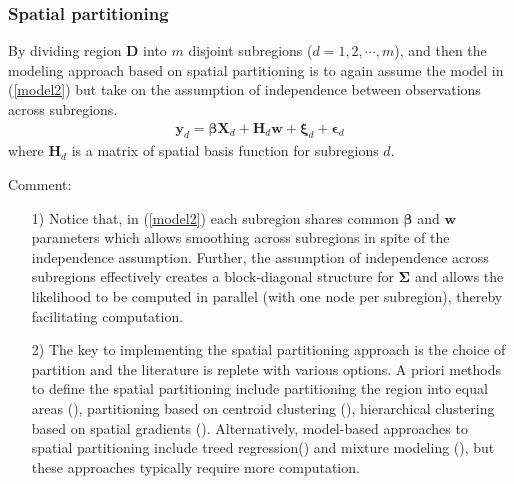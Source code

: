 \documentclass[
12pt, %
a4paper, %
oneside, %
headinclude,footinclude, %
BCOR5mm, %
]{scrartcl}
\begin{document}
\subsubsection{Spatial partitioning}
By dividing region $\boldsymbol{D}$ into $m$ disjoint subregions ($d = 1, 2, \cdots, m$),  and then the modeling approach based on spatial
partitioning is to again assume the model in (\ref{model2}) but take on the assumption of independence between observations across subregions.
\begin{equation}
\begin{aligned}
\boldsymbol{y}_d = \boldsymbol{\beta}\boldsymbol{X}_d + \boldsymbol{H}_d\boldsymbol{w} + \boldsymbol{\xi}_d + \boldsymbol{\epsilon}_d
\end{aligned} \label{model2}
\end{equation}
where $\boldsymbol{H}_d$ is a matrix of spatial basis function for subregions $d$.

\textcolor[rgb]{1.00,0.00,1.00}{Comment:}
\begin{itemize}
 \item [1)] Notice that, in (\ref{model2}) each subregion shares common $\boldsymbol{\beta}$ and $\boldsymbol{w}$ parameters which allows smoothing across subregions in spite of the independence assumption. Further, the assumption of independence across subregions effectively creates a block-diagonal structure for $\boldsymbol{\Sigma}$ and allows the likelihood to be computed in parallel (with one node per subregion), thereby facilitating computation.
 \item [2)] The key to implementing the spatial partitioning approach is the choice of partition and the literature is replete with various options.
  A priori methods to define the spatial
partitioning include partitioning the region into equal areas (\href{https://chenyw68.github.io/Literature/[2011]Covariance approximation for large multivariate spatial data sets.pdf}{\citep{sang2011covariance}}), partitioning based on centroid clustering (\href{https://chenyw68.github.io/Literature/[2005]Analyzing nonstationary spatial data using piecewise Gaussian processes.pdf}{\citep{kim2005analyzing}}), hierarchical clustering based on spatial gradients (\href{https://chenyw68.github.io/Literature/[2017]Nonstationary Gaussian Process Models Using Spatial Hierarchical Clustering from Finite Differences.pdf}{\citep{heaton2017nonstationary}}). Alternatively, model-based approaches to spatial partitioning include treed regression(\href{https://chenyw68.github.io/Literature/[2014]Adaptive Bayesian Nonstationary Modeling for Large Spatial Datasets Using Covariance Approximations.pdf}{\citep{konomi2014adaptive}}) and mixture modeling (\href{https://chenyw68.github.io/Literature/[2014]A multivariate spatial mixture model for areal data.pdf}{\citet{neelon2014multivariate}}), but these approaches typically require more computation.
\end{itemize}
\end{document}
